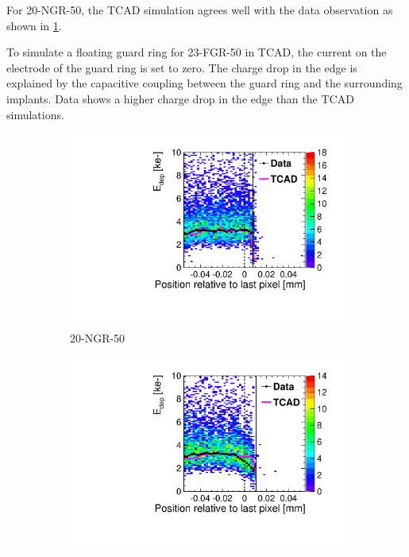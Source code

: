 For 20-NGR-50, the TCAD simulation agrees well with the data
observation as shown in \cref{fig:ChargeCollection20NGR}.

To simulate a floating guard ring for 23-FGR-50 in TCAD, the current
on the electrode of the guard ring is set to zero. The charge drop in
the edge is explained by the capacitive coupling between the guard
ring and the surrounding implants. Data shows a higher charge drop in
the edge than the TCAD simulations.


\begin{figure}[htbp]
  \begin{subfigure}[b]{0.45\textwidth}
    \centering
    \includegraphics[width=\textwidth]{figures/ActiveEdge/20_NGR_Edep_TCAD_data.pdf}
    \caption{20-NGR-50}\label{fig:ChargeCollection20NGR}
  \end{subfigure}\hfill
  \begin{subfigure}[b]{0.45\textwidth}
    \centering
    \includegraphics[width=\textwidth]{figures/ActiveEdge/23_FGR_Edep_TCAD_data.pdf}

\end{subfigure}
\end{figure}
